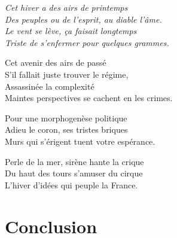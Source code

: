 




\raggedleft
\textit{
Cet hiver a des airs de printemps\\
Des peuples ou de l'esprit, au diable l'âme.\\
Le vent se lève, ça faisait longtemps\\
Triste de s'enfermer pour quelques grammes.\\
}

\medskip

\raggedright

Cet avenir des airs de passé\\
S'il fallait juste trouver le régime,\\
Assassinée la complexité\\
Maintes perspectives se cachent en les crimes.\\

\medskip
\raggedleft

Pour une morphogenèse politique\\
Adieu le coron, ses tristes briques\\
Murs qui s'érigent tuent votre espérance.\\

\medskip
\raggedright

Perle de la mer, sirène hante la crique\\
Du haut des tours s'amuser du cirque\\
L'hiver d'idées qui peuple la France.\\







\newpage

\chapter*{Conclusion}











